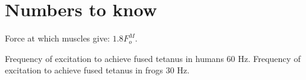 \chapter{Numbers to know}

Force at which muscles give: $1.8F_o^M$.

Frequency of excitation to achieve fused tetanus in humans $60$ Hz.
Frequency of excitation to achieve fused tetanus in frogs $30$ Hz.
